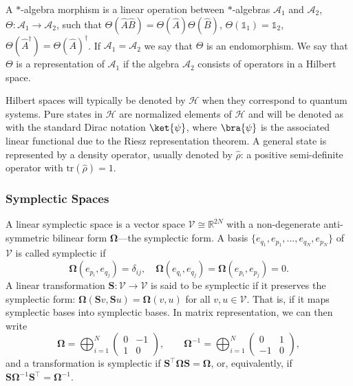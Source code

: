 \documentclass[letterpaper,12pt,titlepage,oneside,final]{book}
\newcommand{\openone}{\mathds{1}}
\renewcommand{\r}{\hat{\rho}}
\begin{document}
A $\ast$-algebra morphism is a linear operation between $\ast$-algebras $\mathcal{A}_1$ and $\mathcal{A}_2$, $\Theta:\mathcal{A}_1\to\mathcal{A}_2$, such that $\Theta(\hat{A}\hat{B}) = \Theta(\hat{A})\Theta(\hat{B})$, $\Theta(\openone_1) = \openone_2$, $\Theta(\hat{A}^\dagger) = \Theta(\hat{A})^\dagger$. If $\mathcal{A}_1 = \mathcal{A}_2$ we say that $\Theta$ is an endomorphism. We say that $\Theta$ is a representation of $\mathcal{A}_1$ if the algebra $\mathcal{A}_2$ consists of operators in a Hilbert space.

Hilbert spaces will typically be denoted by $\mathscr{H}$ when they correspond to quantum systems. Pure states in $\mathscr{H}$ are normalized elements of $\mathscr{H}$ and will be denoted as with the standard Dirac notation $\ket{\psi}$, where $\bra{\psi}$ is the associated linear functional due to the Riesz representation theorem. A general state is represented by a density operator, usually denoted by $\hat{\rho}$: a positive semi-definite operator with $\text{tr}(\r) = 1$. 


\subsubsection*{Symplectic Spaces}

A linear symplectic space is a vector space $\mathcal{V}\cong \mathbb{R}^{2N}$ with a non-degenerate anti-symmetric bilinear form $\bm \Omega$---the symplectic form. A basis $\{ e_{q_1},  e_{p_1},..., e_{q_N}, e_{p_N}\}$ of $\mathcal{V}$ is called symplectic if 
\begin{equation}
    \bm \Omega( e_{p_i}, e_{q_j}) = \delta_{ij}, \quad \bm \Omega( e_{q_i}, e_{q_j}) =\bm \Omega( e_{p_i}, e_{p_j}) = 0.
\end{equation}
A linear transformation $\bm S:\mathcal{V}\to\mathcal{V}$ is said to be symplectic if it preserves the symplectic form: $\bm \Omega(\bm Sv,\bm Su) = \bm \Omega(v,u)$ for all $v,u\in \mathcal{V}$. That is, if it maps symplectic bases into symplectic bases. In matrix representation, we can then write
\begin{equation}
    \bm \Omega = \bigoplus_{i=1}^N \begin{pmatrix} 0 & -1 \\ 1 & 0\end{pmatrix}, \quad \quad
    \bm \Omega^{-1} = \bigoplus_{i=1}^N \begin{pmatrix} 0 & 1 \\ -1 & 0\end{pmatrix},
\end{equation}
and a transformation is symplectic if $\bm S^\intercal \bm \Omega\bm S = \bm \Omega$, or, equivalently, if $\bm S \bm \Omega^{-1} \bm S^\intercal = \bm  \Omega^{-1}$.
\end{document}

